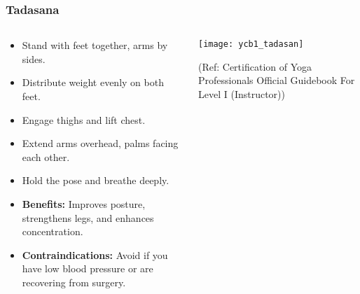 \begin{frame}[fragile]\frametitle{Tadasana}
\begin{columns}
    \begin{column}[T]{0.5\linewidth}
      \begin{itemize}
        \item Stand with feet together, arms by sides.
        \item Distribute weight evenly on both feet.
        \item Engage thighs and lift chest.
        \item Extend arms overhead, palms facing each other.
        \item Hold the pose and breathe deeply.
        \item \textbf{Benefits:} Improves posture, strengthens legs, and enhances concentration.
        \item \textbf{Contraindications:} Avoid if you have low blood pressure or are recovering from surgery.
      \end{itemize}
    \end{column}
    \begin{column}[T]{0.5\linewidth}
        \begin{center}
		        \texttt{[image: ycb1\_tadasan]}
				
				{\tiny (Ref: Certification  of Yoga Professionals Official Guidebook For Level I (Instructor))}		
        \end{center}    
    \end{column}
  \end{columns}
\end{frame}


